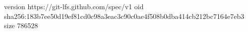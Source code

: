 version https://git-lfs.github.com/spec/v1
oid sha256:183b7ee50d19ef81cd0c98a3eac3c90c0ae4f508b0dba414cb212bc7164e7eb3
size 786528
